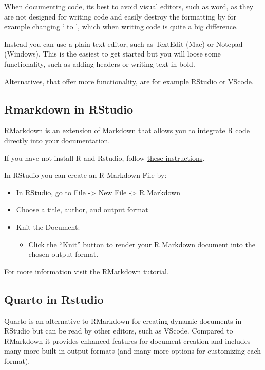 \documentclass[
  letterpaper,
  DIV=11,
  numbers=noendperiod]{scrreprt}
\providecommand{\tightlist}{%
  \setlength{\itemsep}{0pt}\setlength{\parskip}{0pt}}\usepackage{longtable,booktabs,array}
\begin{document}
When documenting code, its best to avoid visual editors, such as word,
as they are not designed for writing code and easily destroy the
formatting by for example changing ` to ', which when writing code is
quite a big difference.

Instead you can use a plain text editor, such as TextEdit (Mac) or
Notepad (Windows). This is the easiest to get started but you will loose
some functionality, such as adding headers or writing text in bold.

Alternatives, that offer more functionality, are for example RStudio or
VScode.

\subsection{Rmarkdown in RStudio}\label{rmarkdown-in-rstudio}

RMarkdown is an extension of Markdown that allows you to integrate R
code directly into your documentation.

If you have not install R and Rstudio, follow
\href{https://rstudio-education.github.io/hopr/starting.html}{these
instructions}.

In RStudio you can create an R Markdown File by:

\begin{itemize}
\tightlist
\item
  In RStudio, go to File -\textgreater{} New File -\textgreater{} R
  Markdown
\item
  Choose a title, author, and output format
\item
  Knit the Document:

  \begin{itemize}
  \tightlist
  \item
    Click the ``Knit'' button to render your R Markdown document into
    the chosen output format.
  \end{itemize}
\end{itemize}

For more information visit
\href{https://rmarkdown.rstudio.com/lesson-1.html}{the RMarkdown
tutorial}.

\subsection{Quarto in Rstudio}\label{quarto-in-rstudio}

Quarto is an alternative to RMarkdown for creating dynamic documents in
RStudio but can be read by other editors, such as VScode. Compared to
RMarkdown it provides enhanced features for document creation and
includes many more built in output formats (and many more options for
customizing each format).
\end{document}
